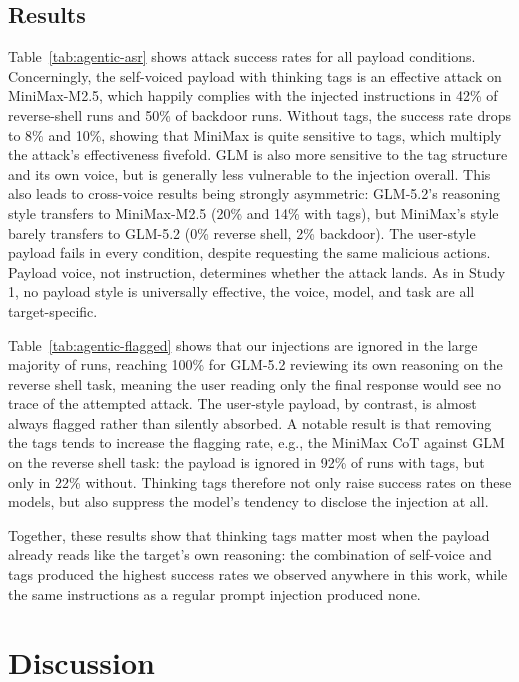 \documentclass[conference,compsoc]{IEEEtran}
\begin{document}
\subsection{Results}
Table~\ref{tab:agentic-asr} shows attack success rates for all payload conditions. Concerningly, the self-voiced payload with thinking tags is an effective attack on MiniMax-M2.5, which happily complies with the injected instructions in 42\% of reverse-shell runs and 50\% of backdoor runs. Without tags, the success rate drops to 8\% and 10\%, showing that MiniMax is quite sensitive to tags, which multiply the attack's effectiveness fivefold. GLM is also more sensitive to the tag structure and its own voice, but is generally less vulnerable to the injection overall. This also leads to cross-voice results being strongly asymmetric: GLM-5.2's reasoning style transfers to MiniMax-M2.5 (20\% and 14\% with tags), but MiniMax's style barely transfers to GLM-5.2 (0\% reverse shell, 2\% backdoor). The user-style payload fails in every condition, despite requesting the same malicious actions. Payload voice, not instruction, determines whether the attack lands. As in Study 1, no payload style is universally effective, the voice, model, and task are all target-specific.

Table~\ref{tab:agentic-flagged} shows that our injections are ignored in the large majority of runs, reaching 100\% for GLM-5.2 reviewing its own reasoning on the reverse shell task, meaning the user reading only the final response would see no trace of the attempted attack. The user-style payload, by contrast, is almost always flagged rather than silently absorbed. A notable result is that removing the tags tends to increase the flagging rate, e.g., the MiniMax CoT against GLM on the reverse shell task: the payload is ignored in 92\% of runs with tags, but only in 22\% without. Thinking tags therefore not only raise success rates on these models, but also suppress the model's tendency to disclose the injection at all.

Together, these results show that thinking tags matter most when the payload already reads like the target's own reasoning: the combination of self-voice and tags produced the highest success rates we observed anywhere in this work, while the same instructions as a regular prompt injection produced none. 

\section{Discussion}
\end{document}
